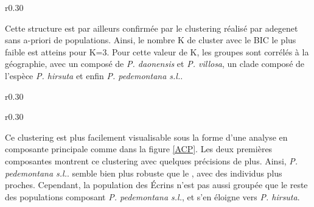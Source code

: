 \begin{wrapfigure}{r}{0.30\textwidth}
	\vspace{-40pt}
	\begin{center}
	\end{center}
	\vspace{-20pt}
	\caption{\textbf{Topologie} faite avec les $F_{st}$}
    \label{topologie}
\end{wrapfigure}

Cette structure est par ailleurs confirmée par le clustering réalisé par adegenet sans a-priori de populations. Ainsi, le nombre K de cluster avec le BIC le plus faible est atteins pour K=3. Pour cette valeur de K, les groupes sont corrélés à la géographie, avec un  composé de \textit{P. daonensis} et \textit{P. villosa}, un clade composé de l'espèce \textit{P. hirsuta} et enfin \textit{P. pedemontana s.l.}.


\begin{wrapfigure}{r}{0.30\textwidth}
	\vspace{-40pt}
	\begin{center}
	\end{center}
	\vspace{-20pt}
	\caption{\textbf{cluster} cluster}
    \label{cluster}
\end{wrapfigure}

\begin{wrapfigure}{r}{0.30\textwidth}
	\vspace{-40pt}
	\begin{center}
	\end{center}
	\vspace{-20pt}
	\caption{\textbf{ACP} ACP}
    \label{ACP}
\end{wrapfigure}

Ce clustering est plus facilement visualisable sous la forme d'une analyse en composante principale comme dans la figure \ref{ACP}. Les deux premières composantes montrent ce clustering avec quelques précisions de plus. Ainsi, \textit{P. pedemontana s.l.}. semble bien plus robuste que le , avec des individus plus proches. Cependant, la population des Écrins n'est pas aussi groupée que le reste des populations composant \textit{P. pedemontana s.l.}, et s'en éloigne vers \textit{P. hirsuta}.

